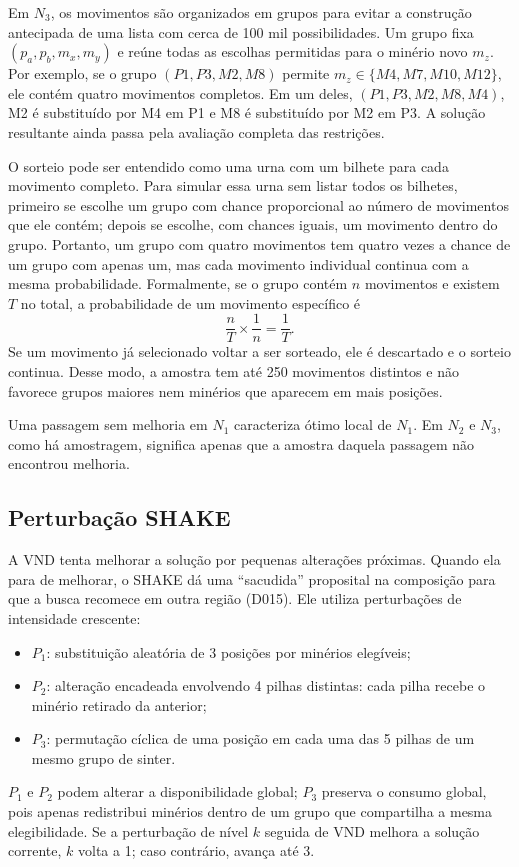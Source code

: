 \documentclass[10pt,twocolumn,a4paper]{article}
\begin{document}
Em $N_3$, os movimentos são organizados em grupos para evitar a construção antecipada de uma lista com cerca de 100 mil possibilidades. Um grupo fixa $(p_a,p_b,m_x,m_y)$ e reúne todas as escolhas permitidas para o minério novo $m_z$. Por exemplo, se o grupo $(P1,P3,M2,M8)$ permite $m_z\in\{M4,M7,M10,M12\}$, ele contém quatro movimentos completos. Em um deles, $(P1,P3,M2,M8,M4)$, M2 é substituído por M4 em P1 e M8 é substituído por M2 em P3. A solução resultante ainda passa pela avaliação completa das restrições.

O sorteio pode ser entendido como uma urna com um bilhete para cada movimento completo. Para simular essa urna sem listar todos os bilhetes, primeiro se escolhe um grupo com chance proporcional ao número de movimentos que ele contém; depois se escolhe, com chances iguais, um movimento dentro do grupo. Portanto, um grupo com quatro movimentos tem quatro vezes a chance de um grupo com apenas um, mas cada movimento individual continua com a mesma probabilidade. Formalmente, se o grupo contém $n$ movimentos e existem $T$ no total, a probabilidade de um movimento específico é
\begin{equation}
\frac{n}{T}\times\frac{1}{n}=\frac{1}{T}.
\end{equation}
Se um movimento já selecionado voltar a ser sorteado, ele é descartado e o sorteio continua. Desse modo, a amostra tem até 250 movimentos distintos e não favorece grupos maiores nem minérios que aparecem em mais posições.

Uma passagem sem melhoria em $N_1$ caracteriza ótimo local de $N_1$. Em $N_2$ e $N_3$, como há amostragem, significa apenas que a amostra daquela passagem não encontrou melhoria.

\subsection{Perturbação SHAKE}

A VND tenta melhorar a solução por pequenas alterações próximas. Quando ela para de melhorar, o SHAKE dá uma ``sacudida'' proposital na composição para que a busca recomece em outra região (D015). Ele utiliza perturbações de intensidade crescente:
\begin{itemize}
    \item $P_1$: substituição aleatória de 3 posições por minérios elegíveis;
    \item $P_2$: alteração encadeada envolvendo 4 pilhas distintas: cada pilha recebe o minério retirado da anterior;
    \item $P_3$: permutação cíclica de uma posição em cada uma das 5 pilhas de um mesmo grupo de sinter.
\end{itemize}
$P_1$ e $P_2$ podem alterar a disponibilidade global; $P_3$ preserva o consumo global, pois apenas redistribui minérios dentro de um grupo que compartilha a mesma elegibilidade. Se a perturbação de nível $k$ seguida de VND melhora a solução corrente, $k$ volta a 1; caso contrário, avança até 3.
\end{document}

